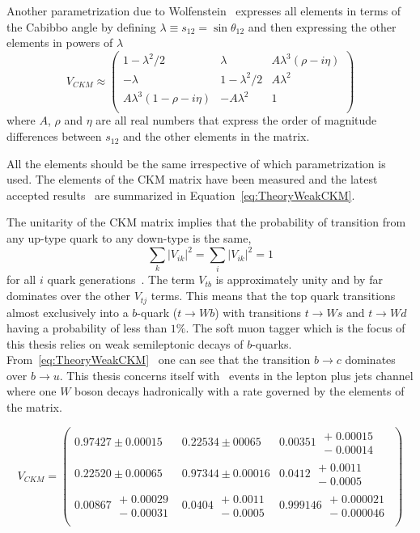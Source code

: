 Another parametrization due to Wolfenstein~\cite{Theory:CKMWolfenstein} expresses all elements in terms of the Cabibbo angle by defining $\lambda\equiv s_{12}=\sin \theta_{12}$ and then expressing the other elements in powers of $\lambda$
%
\begin{equation}
  V_{CKM}
  \approx
  \begin{pmatrix}
  1-\lambda^2/2 & \lambda & A\lambda^3(\rho-i\eta) \\
  -\lambda & 1-\lambda^2/2 & A\lambda^2 \\ 
  A\lambda^3(1-\rho-i\eta) & -A\lambda^2 & 1\\
  \end{pmatrix}
\end{equation}
%
where $A$, $\rho$ and $\eta$ are all real numbers that express the order of magnitude differences between $s_{12}$ and the other elements in the matrix.

All the elements should be the same irrespective of which parametrization is used. The elements of the CKM matrix have been measured and the latest accepted results~\cite{Theory:PDGBooklet} are summarized in Equation~\ref{eq:TheoryWeakCKM}. 

The unitarity of the CKM matrix implies that the probability of transition from any up-type quark to any down-type is the same,
%
\begin{equation} 
  \label{eq:TheoryWeakMixingTotal}
  \sum_{k}|V_{ik}|^{2}=\sum_{i}|V_{ik}|^{2}=1
\end{equation}
%
for all $i$ quark generations~\cite{Theory:WeakUniversaility}.
The term $V_{tb}$ is approximately unity and by far dominates over the other $V_{tj}$ terms. This means that the top quark transitions almost exclusively into a $b$-quark ($t\rightarrow Wb$) with transitions $t\rightarrow Ws$ and $t\rightarrow Wd$ having a probability of less than $1\%$. The soft muon tagger which is the focus of this thesis relies on weak semileptonic decays of $b$-quarks. From~\ref{eq:TheoryWeakCKM}~\cite{Theory:PDGBooklet} one can see that the transition $b\rightarrow c$ dominates over $b\rightarrow u$. This thesis concerns itself with \ttbar\ events in the lepton plus jets channel where one $W$ boson decays hadronically with a rate governed by the elements of the matrix.

\begin{equation}
  V_{CKM}
  =
  \begin{pmatrix}
    0.97427\pm0.00015 & 0.22534\pm00065 & 0.00351\;\substack{+\;0.00015\\-\;0.00014} \\
    0.22520\pm0.00065 & 0.97344\pm0.00016 & 0.0412\;\substack{+\;0.0011\\-\;0.0005} \\
    0.00867\;\substack{+\;0.00029\\-\;0.00031} & 0.0404\;\substack{+\;0.0011\\-\;0.0005} & 0.999146\;\substack{+\;0.000021\\-\;0.000046} \\
  \end{pmatrix}
  \label{eq:TheoryWeakCKM}
\end{equation}

